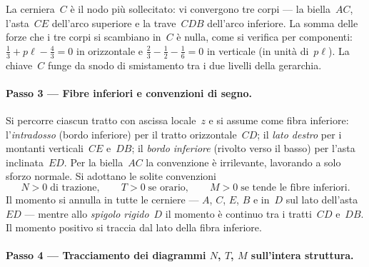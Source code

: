 \begin{oss}
	La cerniera~$C$ è il nodo più sollecitato: vi convergono
	tre corpi --- la biella~$AC$, l'asta~$CE$ dell'arco
	superiore e la trave~$CDB$ dell'arco inferiore. La somma
	delle forze che i tre corpi si scambiano in~$C$ è nulla,
	come si verifica per componenti:
	$\tfrac13 + p\ell - \tfrac43 = 0$ in orizzontale e
	$\tfrac23 - \tfrac12 - \tfrac16 = 0$ in verticale
	(in unità di~$p\ell$). La chiave~$C$ funge da snodo di
	smistamento tra i due livelli della gerarchia.
\end{oss}












\paragraph{Passo 3 --- Fibre inferiori e convenzioni di segno.}

Si percorre ciascun tratto con ascissa locale~$z$ e si
assume come fibra inferiore: l'\emph{intradosso} (bordo
inferiore) per il tratto orizzontale~$CD$; il \emph{lato
	destro} per i montanti verticali~$CE$ e~$DB$; il \emph{bordo
	inferiore} (rivolto verso il basso) per l'asta inclinata~$ED$.
Per la biella~$AC$ la convenzione è irrilevante, lavorando a
solo sforzo normale. Si adottano le solite convenzioni
\[
N > 0 \;\text{di trazione},
\qquad
T > 0 \;\text{se orario},
\qquad
M > 0 \;\text{se tende le fibre inferiori}.
\]
Il momento si annulla in tutte le cerniere --- $A$, $C$,
$E$, $B$ e in~$D$ sul lato dell'asta~$ED$ --- mentre allo
\emph{spigolo rigido}~$D$ il momento è continuo tra i
tratti~$CD$ e~$DB$. Il momento positivo si traccia dal lato
della fibra inferiore.

\paragraph{Passo 4 --- Tracciamento dei diagrammi
	$N$, $T$, $M$ sull'intera struttura.}

